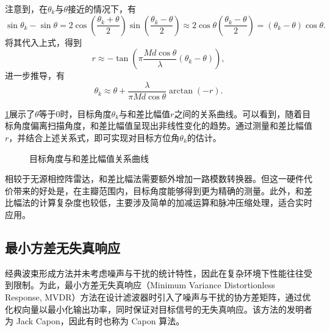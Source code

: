 注意到，在\( \theta_k \)与\( \theta \)接近的情况下，有
\[
    \sin \theta_k - \sin \theta = 2 \cos \left( \frac{\theta_k + \theta}{2} \right) \sin \left( \frac{\theta_k - \theta}{2} \right) \approx 2 \cos \theta  \left( \frac{\theta_k - \theta}{2} \right) = (\theta_k - \theta) \cos \theta .
\]
将其代入上式，得到
\[
    r \approx - \tan \left( \pi \frac{M d \cos \theta}{\lambda} (\theta_k - \theta) \right),
\]
进一步推导，有
\[
    \theta_k \approx \theta + \frac{\lambda}{\pi M d \cos \theta} \arctan (-r).
\]

\cref{fig_ac}展示了\( \theta \)等于0时，目标角度\( \theta_k \)与和差比幅值\( r \)之间的关系曲线。可以看到，随着目标角度偏离扫描角度，和差比幅值呈现出非线性变化的趋势。通过测量和差比幅值\( r \)，并结合上述关系式，即可实现对目标方位角\( \theta_k \)的估计。

\begin{figure}[htb!]
    \centering
    \caption{目标角度与和差比幅值关系曲线}
    \label{fig_ac}
\end{figure}

相较于无源相控阵雷达，和差比幅法需要额外增加一路模数转换器。但这一硬件代价带来的好处是，在主瓣范围内，目标角度能够得到更为精确的测量。此外，和差比幅法的计算复杂度也较低，主要涉及简单的加减运算和脉冲压缩处理，适合实时应用。

\subsection{最小方差无失真响应}
经典波束形成方法并未考虑噪声与干扰的统计特性，因此在复杂环境下性能往往受到限制。为此，最小方差无失真响应（Minimum Variance Distortionless Response, MVDR）方法在设计滤波器时引入了噪声与干扰的协方差矩阵，通过优化权向量以最小化输出功率，同时保证对目标信号的无失真响应。该方法的发明者为 Jack Capon，因此有时也称为 Capon 算法。

